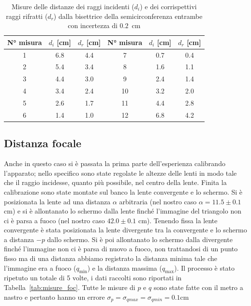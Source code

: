 \documentclass[a4paper,12pt]{article}
\begin{document}
\begin{table}[h!]
    \centering
    \begin{tabular}{c c c|c c c}
        \toprule
        N° misura & $d_i$ [cm] & $d_r$ [cm] & N° misura & $d_i$ [cm] & $d_r$ [cm] \\
        \midrule
        1 & 6.8 & 4.4 & 7 & 0.7 & 0.4 \\
        2 & 5.4 & 3.4 & 8 & 1.6 & 1.1 \\
        3 & 4.4 & 3.0 & 9 & 2.4 & 1.4 \\
        4 & 3.4 & 2.4 & 10 & 3.2 & 2.0 \\
        5 & 2.6 & 1.7 & 11 & 4.4 & 2.8 \\
        6 & 1.4 & 1.0 & 12 & 6.8 & 4.2 \\
        \bottomrule
    \end{tabular}
    \caption{Misure delle distanze dei raggi incidenti ($d_i$) e dei corrispettivi raggi rifratti ($d_r$) dalla bisettrice della semicirconferenza entrambe con incertezza di $0.2$~cm}%
    \label{tab:misure_rif}
\end{table}

\subsection{Distanza focale}

Anche in questo caso si è passata la prima parte dell'esperienza calibrando l'apparato; nello specifico sono state regolate le altezze delle lenti in modo tale che il raggio incidesse, quanto più possibile, nel centro della lente.
Finita la calibrazione sono state montate sul banco la lente convergente e lo schermo. Si è posizionata la lente ad una distanza $\alpha$ arbitraria (nel nostro caso $\alpha = 11.5 \pm 0.1$ cm) e si è allontanato lo schermo dalla lente finché l'immagine del triangolo non ci è parsa a fuoco (nel nostro caso $42.0 \pm 0.1$ cm).
Tenendo fissa la lente convergente è stata posizionata la lente divergente tra la convergente e lo schermo a distanza $-p$ dallo schermo. Si è poi allontanato lo schermo dalla divergente finché l'immagine non ci è parsa di nuovo a fuoco, non trattandosi di un punto fisso ma di una distanza abbiamo registrato la distanza minima tale che l'immagine era a fuoco ($q_{\min}$) e la distanza massima ($q_{\max}$).
Il processo è stato ripetuto un totale di 5 volte, i dati raccolti sono riportati in Tabella~\ref{tab:misure_foc}. Tutte le misure di $p$ e $q$ sono state fatte con il metro a nastro e pertanto hanno un errore $\sigma_p = \sigma_{qmax} = \sigma_{qmin} = 0.1$cm
\end{document}
